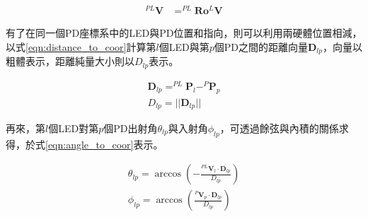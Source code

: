                 \begin{equation}
                    \label{eqn:homogeneous_vector}
                    \begin{aligned}
                    ^{P L} \boldsymbol{V} &=^{P L} \boldsymbol{R} \boldsymbol{o} ^{L}\boldsymbol{ V} 
                    \end{aligned}
                \end{equation}
    
    
    
    
                
                    有了在同一個PD座標系中的LED與PD位置和指向，則可以利用兩硬體位置相減，以式\ref{eqn:distance_to_coor}計算第$l$個LED與第$p$個PD之間的距離向量$\boldsymbol{D}_{lp}$，向量以粗體表示，距離純量大小則以${D}_{lp}$表示。
                    
                    \begin{equation}
                        \label{eqn:distance_to_coor}
                        \begin{aligned}
                        \boldsymbol{D}_{lp} = ^{PL}\boldsymbol{P}_l- ^{P}\boldsymbol{P}_p \\
                        D_{lp} = ||\boldsymbol{D}_{lp}||
                        \end{aligned}
                    \end{equation}
            
                    \qquad
                    再來，第$l$個LED對第$p$個PD出射角$\theta_{lp}$與入射角$\phi_{lp}$，可透過餘弦與內積的關係求得，於式\ref{eqn:angle_to_coor}表示。
            
                    \begin{equation}
                        \label{eqn:angle_to_coor}
                        \begin{aligned}
                        \theta_{lp} = \arccos(-\frac{^{PL}\boldsymbol{V}_l \cdot {\boldsymbol{D}_{lp}}}{D_{lp}})\\
                        \phi_{lp} = \arccos(\frac{^{P}\boldsymbol{V}_p \cdot {\boldsymbol{D}_{lp}}}{D_{lp}})\\
                        \end{aligned}
                    \end{equation}
    
